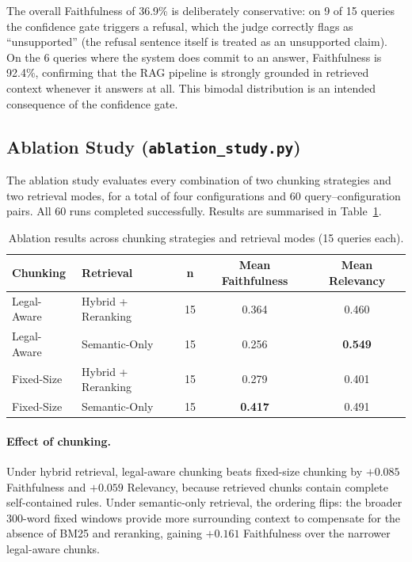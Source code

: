 \documentclass[11pt,a4paper]{article}
\begin{document}
The overall Faithfulness of 36.9\% is deliberately conservative: on 9 of 15 queries the confidence gate triggers a refusal, which the judge correctly flags as ``unsupported'' (the refusal sentence itself is treated as an unsupported claim). On the 6 queries where the system does commit to an answer, Faithfulness is 92.4\%, confirming that the RAG pipeline is strongly grounded in retrieved context whenever it answers at all. This bimodal distribution is an intended consequence of the confidence gate.

\subsection{Ablation Study (\texttt{ablation\_study.py})}

The ablation study evaluates every combination of two chunking strategies and two retrieval modes, for a total of four configurations and 60 query--configuration pairs. All 60 runs completed successfully. Results are summarised in Table~\ref{tab:ablation}.

\begin{table}[H]
\centering
\footnotesize
\caption{Ablation results across chunking strategies and retrieval modes (15 queries each).}
\label{tab:ablation}
\renewcommand{\arraystretch}{1.25}
\begin{tabular}{llccc}
\toprule
\textbf{Chunking} & \textbf{Retrieval} & \textbf{n} & \textbf{Mean Faithfulness} & \textbf{Mean Relevancy} \\
\midrule
Legal-Aware & Hybrid + Reranking & 15 & 0.364 & 0.460 \\
Legal-Aware & Semantic-Only      & 15 & 0.256 & \textbf{0.549} \\
Fixed-Size  & Hybrid + Reranking & 15 & 0.279 & 0.401 \\
Fixed-Size  & Semantic-Only      & 15 & \textbf{0.417} & 0.491 \\
\bottomrule
\end{tabular}
\end{table}

\paragraph{Effect of chunking.} Under hybrid retrieval, legal-aware chunking beats fixed-size chunking by $+0.085$ Faithfulness and $+0.059$ Relevancy, because retrieved chunks contain complete self-contained rules. Under semantic-only retrieval, the ordering flips: the broader 300-word fixed windows provide more surrounding context to compensate for the absence of BM25 and reranking, gaining $+0.161$ Faithfulness over the narrower legal-aware chunks.
\end{document}
